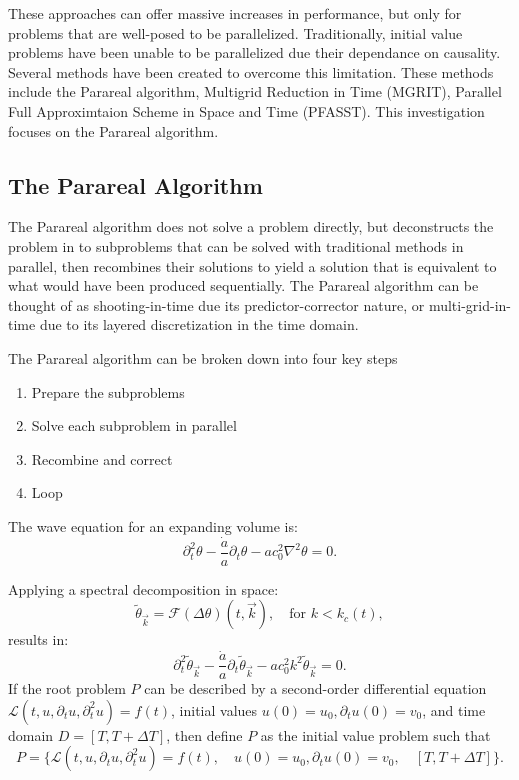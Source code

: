 	These approaches can offer massive increases in performance, but only for problems that are well-posed to be parallelized.  Traditionally, initial value problems have been unable to be parallelized due their dependance on causality.  Several methods have been created to overcome this limitation.  These methods include the Parareal algorithm, Multigrid Reduction in Time (MGRIT), Parallel Full Approximtaion Scheme in Space and Time (PFASST).  This investigation focuses on the Parareal algorithm.

	\subsection{The Parareal Algorithm}

		The Parareal algorithm does not solve a problem directly, but deconstructs the problem in to subproblems that can be solved with traditional methods in parallel, then recombines their solutions to yield a solution that is equivalent to what would have been produced sequentially.  The Parareal algorithm can be thought of as shooting-in-time due its predictor-corrector nature, or multi-grid-in-time due to its layered discretization in the time domain.

		The Parareal algorithm can be broken down into four key steps

		\begin{enumerate}
			\item Prepare the subproblems
			\item Solve each subproblem in parallel
			\item Recombine and correct
			\item Loop
		\end{enumerate}

The wave equation for an expanding volume is:
\[
\partial_t^2 \theta - \frac{\dot{a}}{a} \partial_t \theta - a c_0^2 \nabla^2 \theta = 0.
\]

Applying a spectral decomposition in space:
\[
\tilde{\theta}_{\vec{k}} = \mathcal{F}(\Delta \theta)(t, \vec{k}), \quad \text{for } k < k_c(t),
\]
results in:
\[
\partial_t^2 \tilde{\theta}_{\vec{k}} - \frac{\dot{a}}{a} \partial_t \tilde{\theta}_{\vec{k}} - a c_0^2 k^2 \tilde{\theta}_{\vec{k}} = 0.
\]
			If the root problem $P$ can be described by a second-order differential equation 
			$\mathcal{L}\left(t, u, \partial_t u, \partial_t^2 u \right) = f(t)$, 
			initial values $u(0) = u_0, \partial_t u(0) = v_0$,
			and time domain
			$D = [T, T + \Delta T]$, then define $P$ as the initial value problem such that
			\begin{equation}
				P = \{\mathcal{L}\left(t, u, \partial_t u, \partial_t^2 u \right) = f(t), \quad u(0) = u_0, \partial_t u(0) = v_0, \quad [T, T + \Delta T]\}.
			\end{equation}


